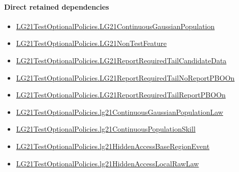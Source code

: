 \documentclass[10pt]{article}
\begin{document}
\paragraph{Direct retained dependencies}
\begin{itemize}\raggedright
\item \hyperlink{paper-prerequisite-f5e1c886d250142b}{LG21\allowbreak{}Test\allowbreak{}Optional\allowbreak{}Policies.\allowbreak{}LG21\allowbreak{}Continuous\allowbreak{}Gaussian\allowbreak{}Population}
\item \hyperlink{governing-declaration-81cb73bf3869c56d}{LG21\allowbreak{}Test\allowbreak{}Optional\allowbreak{}Policies.\allowbreak{}LG21\allowbreak{}Non\allowbreak{}Test\allowbreak{}Feature}
\item \hyperlink{governing-declaration-86a64a1aa812778e}{LG21\allowbreak{}Test\allowbreak{}Optional\allowbreak{}Policies.\allowbreak{}LG21\allowbreak{}Report\allowbreak{}Required\allowbreak{}Tail\allowbreak{}Candidate\allowbreak{}Data}
\item \hyperlink{governing-declaration-d064b16e5df3ff69}{LG21\allowbreak{}Test\allowbreak{}Optional\allowbreak{}Policies.\allowbreak{}LG21\allowbreak{}Report\allowbreak{}Required\allowbreak{}Tail\allowbreak{}No\allowbreak{}Report\allowbreak{}PBO\allowbreak{}On}
\item \hyperlink{governing-declaration-de28b5163ab70838}{LG21\allowbreak{}Test\allowbreak{}Optional\allowbreak{}Policies.\allowbreak{}LG21\allowbreak{}Report\allowbreak{}Required\allowbreak{}Tail\allowbreak{}Report\allowbreak{}PBO\allowbreak{}On}
\item \hyperlink{governing-declaration-8fd8cc4e09eeb58a}{LG21\allowbreak{}Test\allowbreak{}Optional\allowbreak{}Policies.\allowbreak{}lg21\allowbreak{}Continuous\allowbreak{}Gaussian\allowbreak{}Population\allowbreak{}Law}
\item \hyperlink{governing-declaration-339ce55dcb78dfb9}{LG21\allowbreak{}Test\allowbreak{}Optional\allowbreak{}Policies.\allowbreak{}lg21\allowbreak{}Continuous\allowbreak{}Population\allowbreak{}Skill}
\item \hyperlink{governing-declaration-cecb402908ae7bf6}{LG21\allowbreak{}Test\allowbreak{}Optional\allowbreak{}Policies.\allowbreak{}lg21\allowbreak{}Hidden\allowbreak{}Access\allowbreak{}Base\allowbreak{}Region\allowbreak{}Event}
\item \hyperlink{governing-declaration-021e105247bd247f}{LG21\allowbreak{}Test\allowbreak{}Optional\allowbreak{}Policies.\allowbreak{}lg21\allowbreak{}Hidden\allowbreak{}Access\allowbreak{}Local\allowbreak{}Raw\allowbreak{}Law}

\end{itemize}
\end{document}
